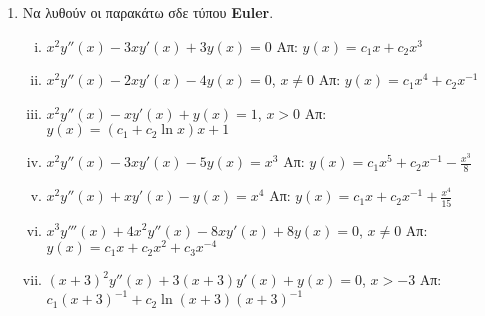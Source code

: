 \documentclass[a4paper,table]{report}
\begin{document}
\begin{enumerate}
  \item Να λυθούν οι παρακάτω σδε τύπου \textlatin{\textbf{Euler}.}
    \begin{enumerate}[i)]
      \item $ x^{2}y''(x)-3xy'(x)+3y(x)=0 $ \hfill Απ: $ y(x)=c_{1}x + c_{2}x^{3} $
      \item $ x^{2}y''(x)-2xy'(x)-4y(x)=0 $,\; $ x \neq 0 $ \hfill Απ: $
        y(x)=c_{1}x^{4}+ c_{2} x^{-1} $ 
      \item $ x^{2}y''(x)-xy'(x)+y(x)=1 $,\; $ x>0 $ \hfill Απ: $ y(x)=(c_{1}+c_{2}
        \ln{x})x + 1 $  
      \item $ x^{2}y''(x)-3xy'(x)-5y(x)=x^{3} $ \hfill Απ: $ y(x)=c_{1}x^{5}+ c_{2}
        x^{-1}- \frac{x^{3}}{8} $ 
      \item $ x^{2}y''(x)+xy'(x)-y(x)=x^{4} $ \hfill Απ: $ y(x)=c_{1}x+c_{2}x^{-1}+
        \frac{x^{4}}{15} $ 
      \item $ x^{3}y'''(x)+4x^{2}y''(x)-8xy'(x)+8y(x)=0 $,\; $ x \neq 0 $ \hfill Απ:
        $y(x)=c_{1}x+c_{2}x^{2}+c_{3}x^{-4}$ 
      \item \label{eul} $ (x+3)^{2}y''(x)+3(x+3)y'(x)+y(x)=0 $,\; $ x>-3 $ \hfill Απ:
        $ c_{1}
        (x+3)^{-1} + c_{2}\ln(x+3)(x+3)^{-1} $
    \end{enumerate}







\end{enumerate}
\end{document}
